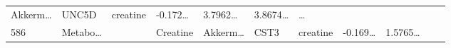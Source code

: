 \documentclass[
]{article}
\begin{document}
\begin{longtable}[]{@{}lllllllllll@{}}
\begin{minipage}[t]{0.07\columnwidth}
Akkerm\ldots{}\strut
\end{minipage} & \begin{minipage}[t]{0.07\columnwidth}\raggedright
UNC5D\strut
\end{minipage} & \begin{minipage}[t]{0.09\columnwidth}\raggedright
creatine\strut
\end{minipage} & \begin{minipage}[t]{0.07\columnwidth}\raggedright
-0.172\ldots{}\strut
\end{minipage} & \begin{minipage}[t]{0.07\columnwidth}\raggedright
3.7962\ldots{}\strut
\end{minipage} & \begin{minipage}[t]{0.07\columnwidth}\raggedright
3.8674\ldots{}\strut
\end{minipage} & \begin{minipage}[t]{0.03\columnwidth}\raggedright
\ldots{}\strut
\end{minipage}\tabularnewline
\begin{minipage}[t]{0.03\columnwidth}\raggedright
586\strut
\end{minipage} & \begin{minipage}[t]{0.07\columnwidth}\raggedright
Metabo\ldots{}\strut
\end{minipage} & \begin{minipage}[t]{0.07\columnwidth}\raggedright
\strut
\end{minipage} & \begin{minipage}[t]{0.09\columnwidth}\raggedright
Creatine\strut
\end{minipage} & \begin{minipage}[t]{0.07\columnwidth}\raggedright
Akkerm\ldots{}\strut
\end{minipage} & \begin{minipage}[t]{0.07\columnwidth}\raggedright
CST3\strut
\end{minipage} & \begin{minipage}[t]{0.09\columnwidth}\raggedright
creatine\strut
\end{minipage} & \begin{minipage}[t]{0.07\columnwidth}\raggedright
-0.169\ldots{}\strut
\end{minipage} & \begin{minipage}[t]{0.07\columnwidth}\raggedright
1.5765\ldots{}\strut
\end{minipage} & \begin{minipage}[t]{0.07\columnwidth}\raggedright

\end{minipage}
\end{longtable}
\end{document}
